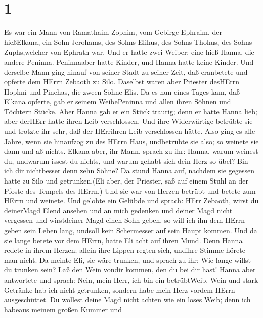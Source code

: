 \hypertarget{section}{%
\section{1}\label{section}}

 Es war ein Mann von Ramathaim-Zophim, vom Gebirge Ephraim,
der hießElkana, ein Sohn Jerohams, des Sohns Elihus, des Sohns Thohus,
des Sohns Zuphs,welcher von Ephrath war.  Und er hatte zwei
Weiber; eine hieß Hanna, die andere Peninna. Peninnaaber hatte Kinder,
und Hanna hatte keine Kinder.  Und derselbe Mann ging hinauf
von seiner Stadt zu seiner Zeit, daß eranbetete und opferte dem HErrn
Zebaoth zu Silo. Daselbst waren aber Priester desHErrn Hophni und
Pinehas, die zween Söhne Elis.  Da es nun eines Tages kam,
daß Elkana opferte, gab er seinem WeibePeninna und allen ihren Söhnen
und Töchtern Stücke.  Aber Hanna gab er ein Stück traurig;
denn er hatte Hanna lieb; aber derHErr hatte ihren Leib verschlossen.
 Und ihre Widerwärtige betrübte sie und trotzte ihr sehr,
daß der HErrihren Leib verschlossen hätte.  Also ging es
alle Jahre, wenn sie hinaufzog zu des HErrn Haus, undbetrübte sie also;
so weinete sie dann und aß nichts.  Elkana aber, ihr Mann,
sprach zu ihr: Hanna, warum weinest du, undwarum issest du nichts, und
warum gehabt sich dein Herz so übel? Bin ich dir nichtbesser denn zehn
Söhne?  Da stund Hanna auf, nachdem sie gegessen hatte zu
Silo und getrunken.(Eli aber, der Priester, saß auf einem Stuhl an der
Pfoste des Tempels des HErrn.)  Und sie war von Herzen
betrübt und betete zum HErrn und weinete.  Und gelobte ein
Gelübde und sprach: HErr Zebaoth, wirst du deinerMagd Elend ansehen und
an mich gedenken und deiner Magd nicht vergessen und wirstdeiner Magd
einen Sohn geben, so will ich ihn dem HErrn geben sein Leben lang,
undsoll kein Schermesser auf sein Haupt kommen.  Und da sie
lange betete vor dem HErrn, hatte Eli acht auf ihren Mund. 
Denn Hanna redete in ihrem Herzen; allein ihre Lippen regten sich,
undihre Stimme hörete man nicht. Da meinte Eli, sie wäre trunken,
 und sprach zu ihr: Wie lange willst du trunken sein? Laß
den Wein vondir kommen, den du bei dir hast!  Hanna aber
antwortete und sprach: Nein, mein Herr, ich bin ein betrübtWeib. Wein
und stark Getränke hab ich nicht getrunken, sondern habe mein Herz
vordem HErrn ausgeschüttet.  Du wollest deine Magd nicht
achten wie ein loses Weib; denn ich habeaus meinem großen Kummer und
